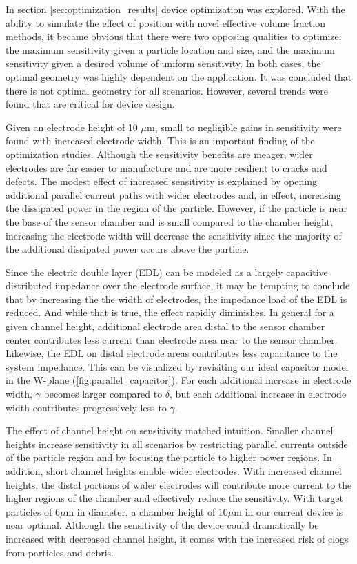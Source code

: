 \par In section \ref{sec:optimization_results} device optimization was explored. With the ability to simulate the effect of position with novel effective volume fraction methods, it became obvious that there were two opposing qualities to optimize: the maximum sensitivity given a particle location and size, and the maximum sensitivity given a desired volume of uniform sensitivity. In both cases, the optimal geometry was highly dependent on the application. It was concluded that there is not optimal geometry for all scenarios. However, several trends were found that are critical for device design.

\par Given an electrode height of 10 $\mu$m, small to negligible gains in sensitivity were found with increased electrode width. This is an important finding of the optimization studies.  Although the sensitivity benefits are meager, wider electrodes are far easier to manufacture and are more resilient to cracks and defects. The modest effect of increased sensitivity is explained by opening additional parallel current paths with wider electrodes and, in effect, increasing the dissipated power in the region of the particle. However, if the particle is near the base of the sensor chamber and is small compared to the chamber height, increasing the electrode width will decrease the sensitivity since the majority of the additional dissipated power occurs above the particle. 

\par Since the electric double layer (EDL) can be modeled as a largely capacitive distributed impedance over the electrode surface, it may be tempting to conclude that by increasing the the width of electrodes, the impedance load of the EDL is reduced.  And while that is true, the effect rapidly diminishes. In general for a given channel height, additional electrode area distal to the sensor chamber center contributes less current than electrode area near to the sensor chamber. Likewise, the EDL on distal electrode areas contributes less capacitance to the system impedance. This can be visualized by revisiting our ideal capacitor model in the W-plane (\ref{fig:parallel_capacitor}). For each additional increase in electrode width, $\gamma$ becomes larger compared to $\delta$, but each additional increase in electrode width contributes progressively less to $\gamma$. 

\par The effect of channel height on sensitivity matched intuition. Smaller channel heights increase sensitivity in all scenarios by restricting parallel currents outside of the particle region and by focusing the particle to higher power regions. In addition, short channel heights enable wider electrodes. With increased channel heights, the distal portions of wider electrodes will contribute more current to the higher regions of the chamber and effectively reduce the sensitivity. With target particles of 6$\mu$m in diameter, a chamber height of 10$\mu$m in our current device is near optimal. Although the sensitivity of the device could dramatically be increased with decreased channel height, it comes with the increased risk of clogs from particles and debris.

